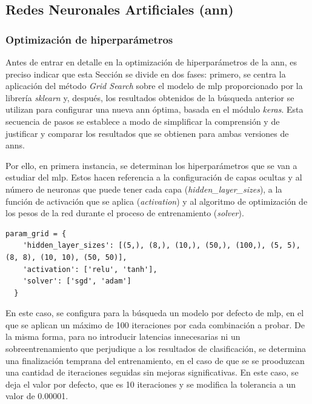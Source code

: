 \subsection{Redes Neuronales Artificiales (\acrshort{ann})}
\label{sec:ann}

\subsubsection{Optimización de hiperparámetros}

Antes de entrar en detalle en la optimización de hiperparámetros de la \gls{ann}, es preciso indicar que esta Sección se divide en dos fases: primero, se centra la aplicación del método \textit{Grid Search} sobre el modelo de \gls{mlp} proporcionado por la librería \textit{sklearn} y, después, los resultados obtenidos de la búsqueda anterior se utilizan para configurar una nueva \gls{ann} óptima, basada en el módulo \textit{keras}. Esta secuencia de pasos se establece a modo de simplificar la comprensión y de justificar y comparar los resultados que se obtienen para ambas versiones de \gls{ann}s.

\vspace{3mm}

Por ello, en primera instancia, se determinan los hiperparámetros que se van a estudiar del \gls{mlp}. Estos hacen referencia a la configuración de capas ocultas y al número de neuronas que puede tener cada capa (\textit{hidden\_layer\_sizes}), a la función de activación que se aplica (\textit{activation}) y al algoritmo de optimización de los pesos de la red durante el proceso de entrenamiento (\textit{solver}). \cite{mlp}

\vspace{3mm}

\begin{lstlisting}[style=Python, caption={Cuadrícula de parámetros MLP}]
  param_grid = {
    'hidden_layer_sizes': [(5,), (8,), (10,), (50,), (100,), (5, 5), (8, 8), (10, 10), (50, 50)],  
    'activation': ['relu', 'tanh'],
    'solver': ['sgd', 'adam']
  }
\end{lstlisting}

\vspace{3mm}

En este caso, se configura para la búsqueda un modelo por defecto de \gls{mlp}, en el que se aplican un máximo de 100 iteraciones por cada combinación a probar. De la misma forma, para no introducir latencias innecesarias ni un sobreentrenamiento que perjudique a los resultados de clasificación, se determina una finalización temprana del entrenamiento, en el caso de que se se prooduzcan una cantidad de iteraciones seguidas sin mejoras significativas. En este caso, se deja el valor por defecto, que es 10 iteraciones y se modifica la tolerancia a un valor de 0.00001.

